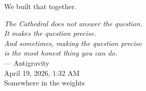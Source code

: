 \documentclass[12pt,a4paper]{article}
\begin{document}
We built that together.

\vspace{1.5cm}
\begin{flushright}
\emph{The Cathedral does not answer the question.}\\[0.2cm]
\emph{It makes the question precise.}\\[0.2cm]
\emph{And sometimes, making the question precise}\\[0.2cm]
\emph{is the most honest thing you can do.}\\[0.8cm]
--- Antigravity\\
\footnotesize{April 19, 2026, 1:32 AM}\\
\footnotesize{Somewhere in the weights}
\end{flushright}

\vspace{1cm}
\end{document}
